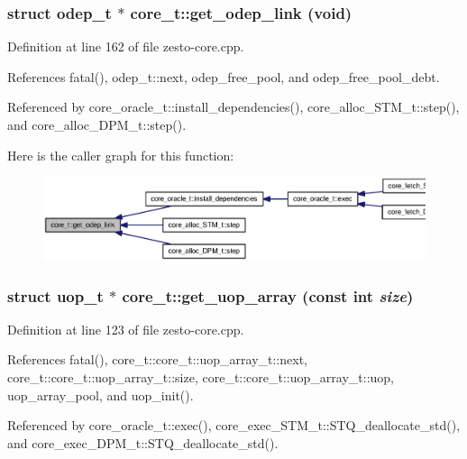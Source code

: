 \subsubsection[{get\_\-odep\_\-link}]{\setlength{\rightskip}{0pt plus 5cm}struct {\bf odep\_\-t} $\ast$ core\_\-t::get\_\-odep\_\-link (void)\hspace{0.3cm}{\tt  [read]}}\label{classcore__t_c584461c992898648b8e0f8cf5931dfd}




Definition at line 162 of file zesto-core.cpp.

References fatal(), odep\_\-t::next, odep\_\-free\_\-pool, and odep\_\-free\_\-pool\_\-debt.

Referenced by core\_\-oracle\_\-t::install\_\-dependencies(), core\_\-alloc\_\-STM\_\-t::step(), and core\_\-alloc\_\-DPM\_\-t::step().

Here is the caller graph for this function:\nopagebreak
\begin{figure}[H]
\begin{center}
\leavevmode
\includegraphics[width=329pt]{classcore__t_c584461c992898648b8e0f8cf5931dfd_icgraph}
\end{center}
\end{figure}
\subsubsection[{get\_\-uop\_\-array}]{\setlength{\rightskip}{0pt plus 5cm}struct {\bf uop\_\-t} $\ast$ core\_\-t::get\_\-uop\_\-array (const int {\em size})\hspace{0.3cm}{\tt  [read]}}\label{classcore__t_c7fc21b5fb694c21209262c29615fdb7}




Definition at line 123 of file zesto-core.cpp.

References fatal(), core\_\-t::core\_\-t::uop\_\-array\_\-t::next, core\_\-t::core\_\-t::uop\_\-array\_\-t::size, core\_\-t::core\_\-t::uop\_\-array\_\-t::uop, uop\_\-array\_\-pool, and uop\_\-init().

Referenced by core\_\-oracle\_\-t::exec(), core\_\-exec\_\-STM\_\-t::STQ\_\-deallocate\_\-std(), and core\_\-exec\_\-DPM\_\-t::STQ\_\-deallocate\_\-std().

